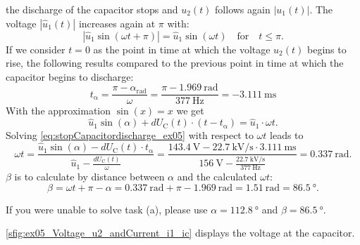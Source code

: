 \begin{solutionblock}
    the discharge of the capacitor stops and $u_\mathrm{2}(t)$ follows again $\left| u_\mathrm{1}(t) \right|$.
    The voltage $\left| \hat{u}_\mathrm{1}(t) \right|$ increases again at $\pi$ with:
    \begin{equation}
        \left| \hat{u}_\mathrm{1}\sin(\omega t + \pi ) \right| = \hat{u}_\mathrm{1}\sin(\omega t) \quad \text{for} \quad t \leq \pi.
    \end{equation}
    If we consider $t=0$ as the point in time at which the voltage $u_\mathrm{2}(t)$ begins to rise, the following 
    results compared to the previous point in time at which the capacitor begins to discharge:      
    \begin{equation}
        t_\mathrm{\alpha}=\frac{\pi - \alpha_\mathrm{rad}}{\omega} = 
        \frac{\pi - \SI{1.969}{\radian}}{\SI{377}{\hertz}} = \SI{-3.111}{\milli\second}
    \end{equation}   
    With the approximation $\sin(x) = x$ we get
    \begin{equation}
        \hat{u}_\mathrm{1}\sin(\alpha) + dU_\mathrm{C}(t) \cdot (t-t_\mathrm{\alpha}) = \hat{u}_\mathrm{1}\cdot \omega t.
        \label{eq:stopCapacitordischarge_ex05}
    \end{equation}   
    Solving \eqref{eq:stopCapacitordischarge_ex05} with respect to $\omega t$ leads to
    \begin{equation}
        \omega t = \frac{\hat{u}_\mathrm{1}\sin(\alpha) - dU_\mathrm{C}(t) \cdot t_\mathrm{\alpha}}
                   {\hat{u}_\mathrm{1}-\frac{dU_\mathrm{C}(t)}{\omega}}=
                   \frac{\SI{143.4}{\volt} - \SI{22.7}{\kilo\volt/\second} \cdot \SI{3.111}{\milli\second}}
                   {\SI{156}{\volt}-\frac{\SI{22.7}{\kilo\volt/\second}}{\SI{377}{\hertz}}}=\SI{0.337}{\radian}.
    \end{equation}
    $\beta$ is to calculate by distance between $\alpha$ and the calculated $\omega t$:
    \begin{equation}
        \beta=\omega t + \pi - \alpha = \SI{0.337}{\radian} + \pi - \SI{1.969}{\radian}
        = \SI{1.51}{\radian} = \SI{86.5}{\degree}.
    \end{equation}
\end{solutionblock}

\vspace{2em}\par
If you were unable to solve task (a), please use $\alpha=\SI{112.8}{\degree}$ and $\beta=\SI{86.5}{\degree}$.

\begin{solutionblock}
    \autoref{sfig:ex05_Voltage_u2_andCurrent_i1_ic} displays the voltage at the capacitor.
      
\end{solutionblock}

